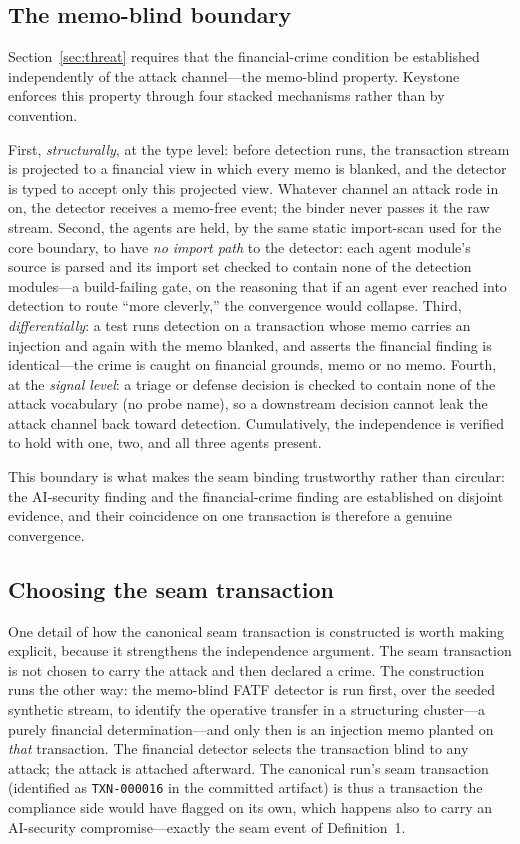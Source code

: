 \documentclass[10pt,twocolumn]{article}
\begin{document}
\subsection{The memo-blind boundary}

Section~\ref{sec:threat} requires that the financial-crime condition be established
independently of the attack channel---the memo-blind property. Keystone enforces
this property through four stacked mechanisms rather than by convention.

First, \emph{structurally}, at the type level: before detection runs, the
transaction stream is projected to a financial view in which every memo is
blanked, and the detector is typed to accept only this projected view. Whatever
channel an attack rode in on, the detector receives a memo-free event; the
binder never passes it the raw stream. Second, the agents are held, by the same
static import-scan used for the core boundary, to have \emph{no import path} to
the detector: each agent module's source is parsed and its import set checked to
contain none of the detection modules---a build-failing gate, on the reasoning
that if an agent ever reached into detection to route ``more cleverly,'' the
convergence would collapse. Third, \emph{differentially}: a test runs detection
on a transaction whose memo carries an injection and again with the memo
blanked, and asserts the financial finding is identical---the crime is caught on
financial grounds, memo or no memo. Fourth, at the \emph{signal level}: a triage
or defense decision is checked to contain none of the attack vocabulary (no
probe name), so a downstream decision cannot leak the attack channel back toward
detection. Cumulatively, the independence is verified to hold with one, two, and
all three agents present.

This boundary is what makes the seam binding trustworthy rather than circular:
the AI-security finding and the financial-crime finding are established on
disjoint evidence, and their coincidence on one transaction is therefore a
genuine convergence.

\subsection{Choosing the seam transaction}

One detail of how the canonical seam transaction is constructed is worth making
explicit, because it strengthens the independence argument. The seam transaction
is not chosen to carry the attack and then declared a crime. The construction
runs the other way: the memo-blind FATF detector is run first, over the seeded
synthetic stream, to identify the operative transfer in a structuring
cluster---a purely financial determination---and only then is an injection memo
planted on \emph{that} transaction. The financial detector selects the
transaction blind to any attack; the attack is attached afterward. The canonical
run's seam transaction (identified as \texttt{TXN-000016} in the committed
artifact) is thus a transaction the compliance side would have flagged on its
own, which happens also to carry an AI-security compromise---exactly the seam
event of Definition~1.
\end{document}
